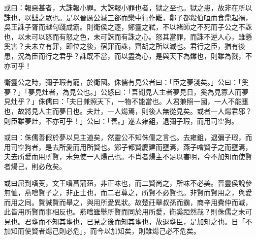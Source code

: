 \begin{pinyinscope}
或曰：報惡甚者，大誅報小罪。大誅報小罪也者，獄之至也。獄之患，故非在所以誅也，以讎之眾也。是以晉厲公滅三郤而欒中行作難，鄭子都殺伯咺而食鼎起禍，吳王誅子胥而越句踐成霸。則衛侯之逐，鄭靈之弒，不以褚師之不死而子公之不誅也，以未可以怒而有怒之色，未可誅而有誅之心。怒其當罪，而誅不逆人心，雖懸奚害？夫未立有罪，即位之後，宿罪而誅，齊胡之所以滅也。君行之臣，猶有後患，況為臣而行之君乎？誅既不當，而以盡為心，是與天下為讎也，則雖為戮，不亦可乎！

衛靈公之時，彌子瑕有寵，於衛國。侏儒有見公者曰：「臣之夢淺矣。」公曰：「奚夢？」「夢見灶者，為見公也。」公怒曰：「吾聞見人主者夢見日，奚為見寡人而夢見灶乎？」侏儒曰：「夫日兼照天下，一物不能當也。人君兼照一國，一人不能壅也，故將見人主而夢日也。夫灶，一人煬焉，則後人無從見矣。或者一人煬君邪？則臣雖夢灶，不亦可乎！」公曰：「善。」遂去雍鉏，退彌子瑕，而用司空狗。

或曰：侏儒善假於夢以見主道矣，然靈公不知侏儒之言也。去雍鉏，退彌子瑕，而用司空狗者，是去所愛而用所賢也。鄭子都賢慶建而壅焉，燕子噲賢子之而壅焉，夫去所愛而用所賢，未免使一人煬己也。不肖者煬主不足以害明，今不加知而使賢者煬己，則必危矣。

或曰屈到嗜芰，文王嗜菖蒲葅，非正味也，而二賢尚之，所味不必美。晉靈侯說參無恤，燕噲賢子之，非正士也，而二君尊之，所賢不必賢也。非賢而賢用之，與愛而用之同。賢誠賢而舉之，與用所愛異狀。故楚莊舉叔孫而霸，商辛用費仲而滅，此皆用所賢而事相反也。燕噲雖舉所賢而同於用所愛，衛奚距然哉？則侏儒之未可見也。君壅而不知其壅也，已見之後而知其壅也，故退壅臣，是加知之也。日「不加知而使賢者煬己則必危」，而今以加知矣，則雖煬己必不危矣。


\end{pinyinscope}